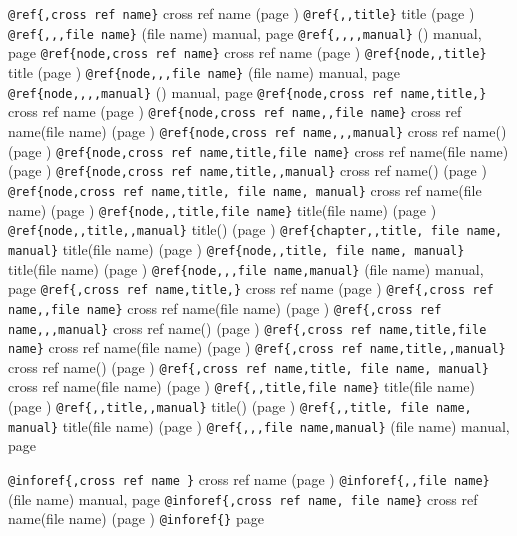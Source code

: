 \documentclass{book}
\begin{document}
\texttt{@ref\{,cross ref name\}} cross ref name (page \pageref{anchor:})
\texttt{@ref\{,,title\}} title (page \pageref{anchor:})
\texttt{@ref\{,,,file name\}} (file name) manual, page \pageref{anchor:}
\texttt{@ref\{,,,,manual\}} () manual, page \pageref{anchor:}
\texttt{@ref\{node,cross ref name\}} cross ref name (page \pageref{anchor:node})
\texttt{@ref\{node,,title\}} title (page \pageref{anchor:node})
\texttt{@ref\{node,,,file name\}} (file name) manual, page \pageref{anchor:node}
\texttt{@ref\{node,,,,manual\}} () manual, page \pageref{anchor:node}
\texttt{@ref\{node,cross ref name,title,\}} cross ref name (page \pageref{anchor:node})
\texttt{@ref\{node,cross ref name,,file name\}} cross ref name(file name) (page \pageref{anchor:node})
\texttt{@ref\{node,cross ref name,,,manual\}} cross ref name() (page \pageref{anchor:node})
\texttt{@ref\{node,cross ref name,title,file name\}} cross ref name(file name) (page \pageref{anchor:node})
\texttt{@ref\{node,cross ref name,title,,manual\}} cross ref name() (page \pageref{anchor:node})
\texttt{@ref\{node,cross ref name,title, file name, manual\}} cross ref name(file name) (page \pageref{anchor:node})
\texttt{@ref\{node,,title,file name\}} title(file name) (page \pageref{anchor:node})
\texttt{@ref\{node,,title,,manual\}} title() (page \pageref{anchor:node})
\texttt{@ref\{chapter,,title, file name, manual\}} title(file name) (page \pageref{anchor:chapter})
\texttt{@ref\{node,,title, file name, manual\}} title(file name) (page \pageref{anchor:node})
\texttt{@ref\{node,,,file name,manual\}} (file name) manual, page \pageref{anchor:node}
\texttt{@ref\{,cross ref name,title,\}} cross ref name (page \pageref{anchor:})
\texttt{@ref\{,cross ref name,,file name\}} cross ref name(file name) (page \pageref{anchor:})
\texttt{@ref\{,cross ref name,,,manual\}} cross ref name() (page \pageref{anchor:})
\texttt{@ref\{,cross ref name,title,file name\}} cross ref name(file name) (page \pageref{anchor:})
\texttt{@ref\{,cross ref name,title,,manual\}} cross ref name() (page \pageref{anchor:})
\texttt{@ref\{,cross ref name,title, file name, manual\}} cross ref name(file name) (page \pageref{anchor:})
\texttt{@ref\{,,title,file name\}} title(file name) (page \pageref{anchor:})
\texttt{@ref\{,,title,,manual\}} title() (page \pageref{anchor:})
\texttt{@ref\{,,title, file name, manual\}} title(file name) (page \pageref{anchor:})
\texttt{@ref\{,,,file name,manual\}} (file name) manual, page \pageref{anchor:}

\texttt{@inforef\{,cross ref name \}} cross ref name (page \pageref{anchor:})
\texttt{@inforef\{,,file name\}} (file name) manual, page \pageref{anchor:}
\texttt{@inforef\{,cross ref name, file name\}} cross ref name(file name) (page \pageref{anchor:})
\texttt{@inforef\{\}} page \pageref{anchor:}
\end{document}
